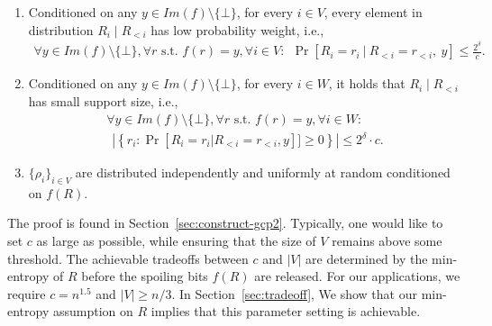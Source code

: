 \begin{theorem} 
\begin{enumerate}
    \item 
    Conditioned on any $y \in Im(f) \setminus \{\bot\}$, 
    for every $i \in V$, every element in distribution $R_i \mid R_{<i}$ has low probability weight, i.e.,
    \begin{align*}
    \forall y \in Im(f) \setminus \{\bot\}, \forall r \mbox{ s.t. } f(r) = y, \forall i \in V:~~ 
    \Pr\left[R_i = r_i~ \Bigg |~R_{<i} = r_{<i},~ y\right]
    \leq  \frac{2^{\delta}}{c}.
    \end{align*}
    \item Conditioned on any $y \in Im(f) \setminus \{\bot\}$, 
    for every $i \in W$, it holds that $R_i \mid R_{<i}$ has small support size, i.e.,
    \begin{eqnarray*}
        \forall y \in Im(f) \setminus \{\bot\}, \forall r \mbox{ s.t. } f(r) =  y, \forall i \in W: \\
        ~~\left | \left \{ r_i : \Pr[R_i = r_i|R_{<i} = r_{<i}, y]] \geq 0 \right \}  \right | \leq 2^{\delta} \cdot c.
    \end{eqnarray*}
    \item $\{\rho_i\}_{i \in V}$
    are distributed independently and uniformly at random
    conditioned on $f(R)$.
\end{enumerate}
\end{theorem}
The proof is found in Section~\ref{sec:construct-gcp2}. 
%
Typically, one would like to set $c$ as large as possible, while ensuring that
the size of $V$ remains above some threshold. The achievable tradeoffs between $c$ and $|V|$ are determined by the min-entropy of $R$
before the spoiling bits $f(R)$ are released. For our applications, we require
$c = n^{1.5}$ and $|V| \geq n/3$. 
In Section~\ref{sec:tradeoff},
We show that our min-entropy assumption on $R$
implies that this parameter setting is achievable. 

